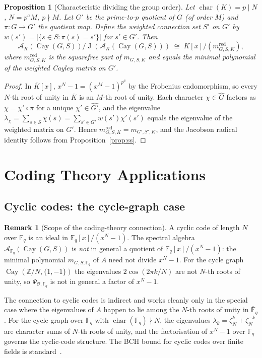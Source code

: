 \documentclass[12pt]{amsart}
\numberwithin{equation}{section}
\theoremstyle{plain}
\newtheorem{proposition}[theorem]{Proposition}
\theoremstyle{definition}
\newtheorem{remark}[theorem]{Remark}
\DeclareMathOperator{\Jac}{J}
\DeclareMathOperator{\ch}{char}
\DeclareMathOperator{\Cay}{Cay}
\newcommand{\Z}{\mathbb{Z}}
\newcommand{\F}{\mathbb{F}}
\newcommand{\calA}{\mathcal{A}}
\newcommand{\calO}{\mathcal{O}}
\newcommand{\Ghat}{\widehat{G}}
\begin{document}
\begin{proposition}[Characteristic dividing the group order]
\label{prop:charp}
Let $\ch(K) = p \mid N$, $N = p^a M$, $p \nmid M$.  Let $G'$ be the
prime-to-$p$ quotient of $G$ (of order $M$) and $\pi : G \to G'$ the
quotient map.  Define the weighted connection set $S'$ on $G'$ by
$w(s') = |\{s \in S : \pi(s) = s'\}|$ for $s' \in G'$.  Then
\[
  \calA_K(\Cay(G,S))\big/\Jac(\calA_K(\Cay(G,S)))
  \;\cong\;
  K[x]\big/(m_{G,S,K}^{\mathrm{red}}),
\]
where $m_{G,S,K}^{\mathrm{red}}$ is the squarefree part of $m_{G,S,K}$
and equals the minimal polynomial of the weighted Cayley matrix on $G'$.
\end{proposition}

\begin{proof}
In $\overline{K}[x]$, $x^N - 1 = (x^M - 1)^{p^a}$ by the Frobenius
endomorphism, so every $N$-th root of unity in $\overline{K}$ is an $M$-th
root of unity.  Each character $\chi \in \Ghat$ factors as $\chi = \chi'
\circ \pi$ for a unique $\chi' \in \widehat{G'}$, and the eigenvalue
$\lambda_\chi = \sum_{s \in S} \chi(s) = \sum_{s' \in G'} w(s') \chi'(s')$
equals the eigenvalue of the weighted matrix on $G'$.  Hence
$m_{G,S,K}^{\mathrm{red}} = m_{G',S',K}$, and the Jacobson radical
identity follows from Proposition~\ref{prop:ss}.
\end{proof}

\section{Coding Theory Applications}
\label{sec:coding}

\subsection{Cyclic codes: the cycle-graph case}

\begin{remark}[Scope of the coding-theory connection]
\label{rem:coding-scope}
A cyclic code of length $N$ over $\F_q$ is an ideal in $\F_q[x]/(x^N-1)$.
The spectral algebra $\calA_{\F_q}(\Cay(G,S))$ is \emph{not} in general a
quotient of $\F_q[x]/(x^N-1)$: the minimal polynomial $m_{G,S,\F_q}$ of
$A$ need not divide $x^N-1$.  For the cycle graph $\Cay(\Z/N,\{1,-1\})$
the eigenvalues $2\cos(2\pi k/N)$ are not $N$-th roots of unity, so
$\Psi_{\calO,\F_q}$ is not in general a factor of $x^N-1$.

The connection to cyclic codes is indirect and works cleanly only in the
special case where the eigenvalues of $A$ happen to lie among the $N$-th
roots of unity in $\overline{\F}_q$.  For the cycle graph over $\F_q$ with
$\ch(\F_q) \nmid N$, the eigenvalues $\lambda_k = \zeta_N^k + \zeta_N^{-k}$
are character sums of $N$-th roots of unity, and the factorisation of
$x^N-1$ over $\F_q$ governs the cyclic-code structure.
The BCH bound for cyclic codes over finite fields is standard~\cite{HP03}.
\end{remark}
\end{document}
